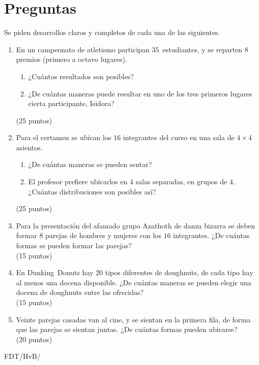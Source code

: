 \documentclass[spanish, fleqn]{article}
\title{Estructuras Discretas \\
       Tarea \#\num \\
       ``Revisión combinatoria''}
\author{Funda Dream Team}
\date{3 de mayo de 2015}
\begin{document}
\maketitle
\thispagestyle{empty}

\section*{Preguntas}

  Se piden desarrollos claros y completos de cada una de las siguientes.

  \begin{enumerate}
  \item
    En un campeonato de atletismo participan \(35\)~estudiantes,
    y se reparten \(8\) premios
    (primero a octavo lugares).
    \begin{enumerate}
    \item
      ¿Cuántos resultados son posibles?
    \item
      ¿De cuántas maneras puede resultar en uno de los tres primeros lugares
      cierta participante,
      Isidora?
    \end{enumerate}
    \hspace*{\fill}(25 puntos)
  \item
    Para el certamen se ubican los \(16\) integrantes del curso
    en una sala de \(4 \times 4\) asientos.
    \begin{enumerate}
    \item
      ¿De cuántas maneras se pueden sentar?
    \item
      El profesor prefiere ubicarlos en \(4\) salas separadas,
      en grupos de \(4\).
      ¿Cuántas distribuciones son posibles así?
    \end{enumerate}
    \hspace*{\fill}(25 puntos)
  \item
    Para la presentación del afamado grupo Azathoth de danza bizarra
    se deben formar \(8\) parejas de hombres y mujeres
    con los \(16\) integrantes.
    ¿De cuántas formas se pueden formar las parejas?
    \\ \hspace*{\fill}(15 puntos)
  \item
    En Dunking~Donuts hay \(20\) tipos diferentes de doughnuts,
    de cada tipo hay al menos una docena disponible.
    ¿De cuántas maneras se pueden elegir una docena de doughnuts
    entre las ofrecidas?
    \\ \hspace*{\fill}(15 puntos)
  \item
    Veinte parejas casadas van al cine,
    y se sientan en la primera fila,
    de forma que las parejas se sientan juntas.
    ¿De cuántas formas pueden ubicarse?
    \\ \hspace*{\fill}(20 puntos)
  \end{enumerate}


  \vfill\hfill FDT/HvB/\LaTeXe
\end{document}
